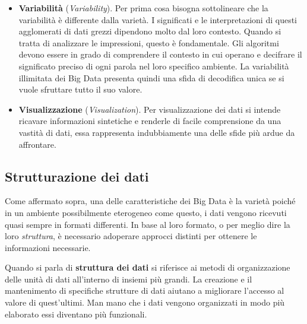 \begin{itemize}
    \item \textbf{Variabilità} (\textit{Variability}). Per prima cosa bisogna sottolineare che la variabilità è differente dalla varietà. I significati e le interpretazioni di questi agglomerati di dati grezzi dipendono molto dal loro contesto. Quando si tratta di analizzare le impressioni, questo è fondamentale. Gli algoritmi devono essere in grado di comprendere il contesto in cui operano e decifrare il significato preciso di ogni parola nel loro specifico ambiente. La variabilità illimitata dei Big Data presenta quindi una sfida di decodifica unica se si vuole sfruttare tutto il suo valore.
    \item \textbf{Visualizzazione} (\textit{Visualization}). Per visualizzazione dei dati si intende ricavare informazioni sintetiche e renderle di facile comprensione da una vastità di dati, essa rappresenta indubbiamente una delle sfide più ardue da affrontare.
\end{itemize}

\subsection{Strutturazione dei dati}

Come affermato sopra, una delle caratteristiche dei Big Data è la varietà poiché in un ambiente possibilmente eterogeneo come questo, i dati vengono ricevuti quasi sempre in formati differenti. In base al loro formato, o per meglio dire la loro \textit{struttura}, è necessario adoperare approcci distinti per ottenere le informazioni necessarie.

Quando si parla di \textbf{struttura dei dati} si riferisce ai metodi di organizzazione delle unità di dati all’interno di insiemi più grandi. La creazione e il mantenimento di specifiche strutture di dati aiutano a migliorare l’accesso al valore di quest’ultimi. Man mano che i dati vengono organizzati in modo più elaborato essi diventano più funzionali.\cite{theastrologypage_data_structure}

